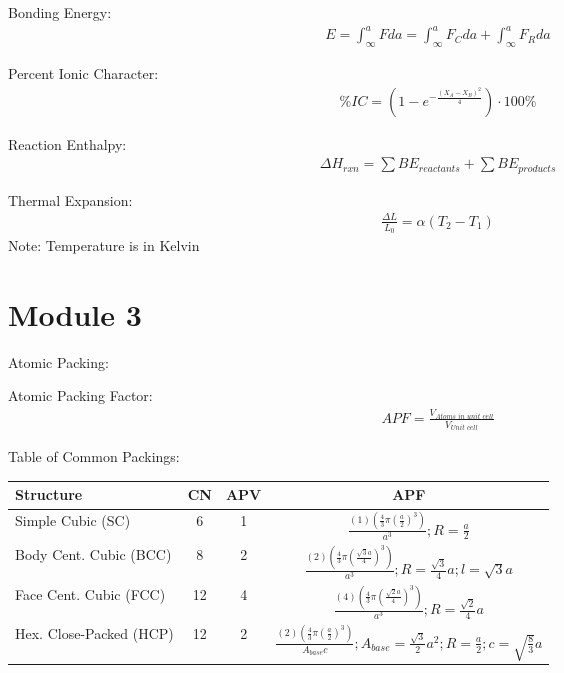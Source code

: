 \documentclass{article}
\begin{document}
\begin{multicols}{2}
Bonding Energy:
\begin{equation*}
    \begin{split}
        E = \int_\infty^a F \textit{da}  
          = \int_\infty^a F_C \textit{da} + \int_\infty^a F_R \textit{da}
    \end{split}
\end{equation*}

Percent Ionic Character:
\begin{equation*}
    \begin{split}
        \%IC = (1-e^{-\frac{(X_A-X_B)^2}{4}}) \cdot 100\%
    \end{split}
\end{equation*}

Reaction Enthalpy:
\begin{equation*}
    \begin{split}
        \Delta H_{\textit{rxn}} = \sum B E_{\textit{reactants}} + \sum B E_{\textit{products}}
    \end{split}
\end{equation*}

Thermal Expansion:
\begin{equation*}
    \begin{split}
        \frac{\Delta L}{L_0} = \alpha (T_2 - T_1)
    \end{split}
\end{equation*}
Note: Temperature is in Kelvin

\section{Module 3}

Atomic Packing:

Atomic Packing Factor:
\begin{equation*}
    \begin{split}
        \textit{APF} = \frac{V_\textit{Atoms in unit cell}}{V_\textit{Unit cell}} 
    \end{split}
\end{equation*}

Table of Common Packings:
\begin{center}
    \begin{tabular}{ l c c c }
        Structure                    & CN & APV & APF\\
        \hline
        Simple Cubic (SC)            & 6  & 1   & $\frac{(1)(\frac{4}{3} \pi (\frac{a}{2})^3)}{a^3}; R = \frac{a}{2}$\\ 
        Body Cent. Cubic (BCC)       & 8  & 2   & $\frac{(2)(\frac{4}{3} \pi (\frac{\sqrt{3}a}{4})^3)}{a^3}; R = \frac{\sqrt{3}}{4}a; l=\sqrt{3}a$\\  
        Face Cent. Cubic (FCC)       & 12 & 4   & $\frac{(4)(\frac{4}{3} \pi (\frac{\sqrt{2}a}{4})^3)}{a^3}; R = \frac{\sqrt{2}}{4}a$\\  
        Hex. Close-Packed (HCP)      & 12 & 2   & $\frac{(2)(\frac{4}{3} \pi (\frac{a}{2})^3)}{A_{base} c}; A_{base} = \frac{\sqrt{3}}{2}a^2; R = \frac{a}{2}; c = \sqrt{\frac{8}{3}}a$\\  
    \end{tabular}
\end{center}


\end{multicols}
\end{document}
